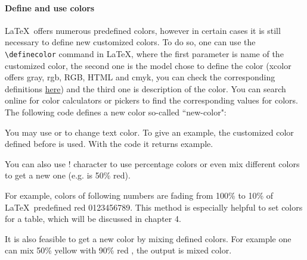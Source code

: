 	\paragraph{Define and use colors}
	
	\LaTeX~offers numerous predefined colors, however in certain cases it is still necessary to define new customized colors. To do so, one can use the {\verb|\definecolor|} command in \LaTeX, where the first parameter is name of the customized color, the second one is the model chose to define the color (xcolor offers gray, rgb, RGB, HTML and cmyk, you can check the corresponding definitions \href{https://en.wikibooks.org/wiki/LaTeX/Colors#Color_Models}{here}) and the third one is description of the color. You can search online for color calculators or pickers to find the corresponding values for colors. The following code defines a new color so-called ``new-color":
	
	{}
	
	You may use {} or {\color{blue}{\verb|\textcolor{color}{text}|}} to change text color. To give an example, the customized color defined before is used. With the code {} it returns {\color{new-color}example}. 
	
	You can also use ! character to use percentage colors or even mix different colors to get a new one (e.g. {\color{blue}{\verb|red!50|}} is 50\% red). 
	
	For example, colors of following numbers are fading from 100\% to 10\% of \LaTeX~predefined red {\color{red!100}0}{\color{red!90}1}{\color{red!80}2}{\color{red!70}3}{\color{red!60}4}{\color{red!50}5}{\color{red!40}6}{\color{red!30}7}{\color{red!20}8}{\color{red!10}9}. This method is especially helpful to set colors for a table, which will be discussed in chapter 4.
	
	It is also feasible to get a new color by mixing defined colors. For example one can mix 50\% yellow with 90\% red {}, the output is {\color{yellow!50!red!90}mixed color}.
	
